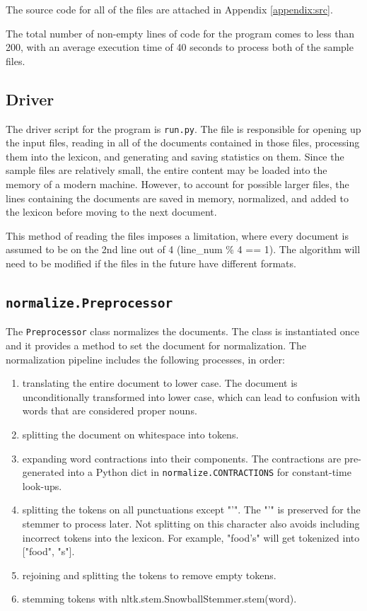 \documentclass[11pt]{article}
\begin{document}
The source code for all of the files are attached in Appendix \ref{appendix:src}.

The total number of non-empty lines of code for the program comes to less than 200, with an average execution time of 40 seconds to process both of the sample files.

\subsection{Driver} \label{sec:driver}
The driver script for the program is \texttt{run.py}. The file is responsible for opening up the input files, reading in all of the documents contained in those files, processing them into the lexicon, and generating and saving statistics on them. Since the sample files are relatively small, the entire content may be loaded into the memory of a modern machine. However, to account for possible larger files, the lines containing the documents are saved in memory, normalized, and added to the lexicon before moving to the next document.

This method of reading the files imposes a limitation, where every document is assumed to be on the 2nd line out of 4 (line\_num \% 4 == 1). The algorithm will need to be modified if the files in the future have different formats.

\subsection{\texttt{normalize.Preprocessor}}
The \texttt{Preprocessor} class normalizes the documents. The class is instantiated once and it provides a method to set the document for normalization. The normalization pipeline includes the following processes, in order:

\begin{enumerate}
    \item translating the entire document to lower case. The document is unconditionally transformed into lower case, which can lead to confusion with words that are considered proper nouns.

    \item splitting the document on whitespace into tokens.

    \item expanding word contractions into their components. The contractions are pre-generated into a Python dict in \texttt{normalize.CONTRACTIONS} for constant-time look-ups.

    \item splitting the tokens on all punctuations except "'". The "'" is preserved for the stemmer to process later. Not splitting on this character also avoids including incorrect tokens into the lexicon. For example, "food's" will get tokenized into ["food", "s"].

    \item rejoining and splitting the tokens to remove empty tokens.

    \item stemming tokens with nltk.stem.SnowballStemmer.stem(word).
\end{enumerate}
\end{document}
